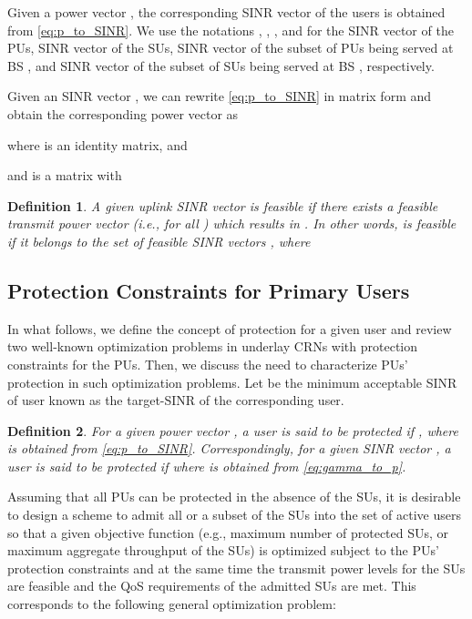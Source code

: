 \documentclass[journal,twoside]{IEEEtran}
\newtheorem {definition}{Definition}
\begin{document}
	Given a power vector , the corresponding SINR vector of the users  is obtained from \eqref{eq:p_to_SINR}. We use the notations , , , and  for the SINR vector of the PUs, SINR vector of the SUs, SINR vector of the subset of PUs being served at BS , and SINR vector of the subset of SUs being served at BS , respectively.
	
		Given an SINR vector , we can rewrite \eqref{eq:p_to_SINR} in matrix form and obtain  the corresponding power vector  as \cite{constrained_TPC}
		
		where   is an  identity matrix, and
		
		and  is a  matrix with
		
	
	\begin{definition}
		A given uplink SINR vector  is feasible if there exists a feasible transmit power vector  (i.e.,  for all ) which results in . In other words,  is feasible if it belongs to the set of feasible SINR vectors , where
		


	\end{definition}

	
	
\subsection{Protection Constraints for Primary Users}
	\label{sec:problem_statement}
In what follows, we define the concept of  protection for a given user and review two well-known optimization problems in underlay CRNs with  protection constraints for the PUs. Then, we discuss the need to characterize PUs' protection in such optimization problems.
	Let  be the minimum acceptable SINR of user  known as the target-SINR of the corresponding user. 
	
	\begin{definition}
			For a given power vector , a user  is said to be protected if , where  is obtained from \eqref{eq:p_to_SINR}. Correspondingly, for a given SINR vector , a user  is said to be protected if  where  is obtained from \eqref{eq:gamma_to_p}.
		\end{definition}


	


	Assuming that all PUs can be protected in the absence of the SUs, it is desirable to design a scheme to admit all or a subset of the SUs into the set of active users so that a given objective function  (e.g., maximum number of protected SUs, or maximum aggregate throughput of the SUs) is optimized subject to the PUs' protection constraints and at the same time the transmit power levels for the SUs are feasible and the QoS requirements of the admitted SUs are  met. This corresponds to the following general optimization problem:
		
\end{document}
